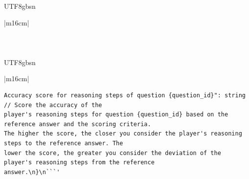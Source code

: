 \documentclass[11pt]{article}
\begin{document}
{\begin{CJK}{UTF8}{gbsn}
\begin{table}[ht!]
\begin{minipage}[t]{\linewidth}
\begin{tabular}{|m{16cm}|}
\begin{minipage}[t]{\linewidth}
\begin{verbatim}
\end{verbatim}
\end{minipage} \\

\end{tabular}
\end{minipage}

\end{table}
\end{CJK}



\clearpage

\begin{CJK}{UTF8}{gbsn}
\begin{table}[t!]
\centering
\begin{minipage}[t!]{\linewidth}
\begin{tabular}{|m{16cm}|}
\begin{minipage}[t]{\linewidth}
\small\begin{verbatim}
Accuracy score for reasoning steps of question {question_id}": string  // Score the accuracy of the 
player's reasoning steps for question {question_id} based on the reference answer and the scoring criteria.
The higher the score, the closer you consider the player's reasoning steps to the reference answer. The 
lower the score, the greater you consider the deviation of the player's reasoning steps from the reference 
answer.\n}\n```'


\end{verbatim}
\end{minipage}
\end{tabular}
\end{minipage}
\end{table}
\end{CJK}}
\end{document}

